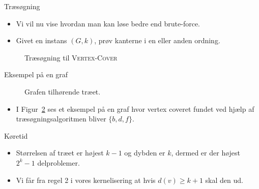 \begin{frame}{Træsøgning}
    \begin{itemize}
        \item Vi vil nu vise hvordan man kan løse bedre end brute-force.
        \item Givet en instans $(G,k)$, prøv kanterne i en eller anden ordning.
    \end{itemize}
    \begin{figure}
        \centering
        \caption{\label{fig:treesearchvc} Træsøgning til \textsc{Vertex-Cover}}
    \end{figure}
\end{frame}

\begin{frame}{Eksempel på en graf}
    \begin{figure}
        \centering
        \caption{\label{fig:treegraph} Grafen tilhørende træet.}
    \end{figure}
    \begin{itemize}
        \item I Figur~\ref{fig:treegraph} ses et eksempel på en graf hvor vertex coveret fundet ved hjælp af træsøgningsalgoritmen bliver $\{b,d,f\}$.
    \end{itemize}
\end{frame}

\begin{frame}{Køretid}
    \begin{itemize}
        \item Størrelsen af træet er højest $k-1$ og dybden er $k$, dermed er der højest $2^{k}-1$ delproblemer.
        \item Vi får fra regel 2 i vores kernelisering at hvis $d(v) \ge k+1$ skal den ud.
    \end{itemize}
\end{frame}

